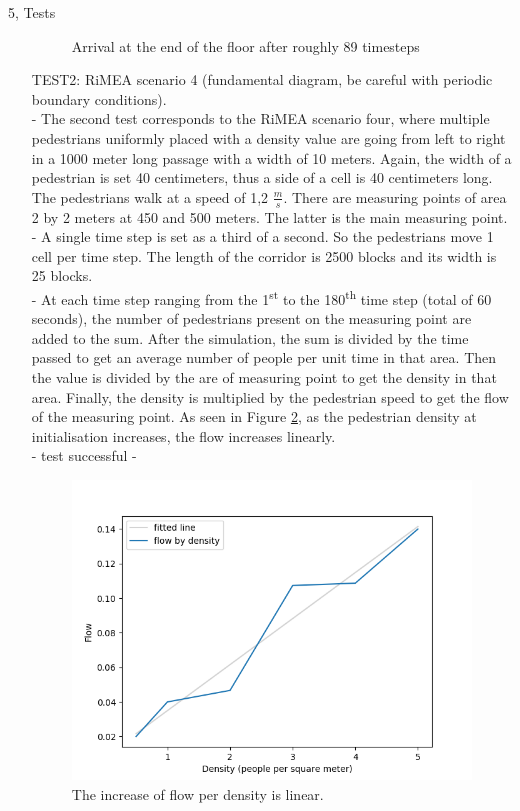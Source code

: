 \documentclass[10pt,a4paper]{article}
\begin{document}
\begin{task}{5, Tests}
\begin{enumerate}
\begin{figure}
    \caption{Arrival at the end of the floor after roughly 89 timesteps}
    \label{fig:result_test1}
\end{figure}
\item[TEST2:] RiMEA scenario 4 (fundamental diagram, be careful with periodic boundary conditions).\\
- The second test corresponds to the RiMEA scenario four, where multiple pedestrians uniformly placed with a density value are going from left to right in a 1000 meter long passage with a width of 10 meters. Again, the width of a pedestrian is set 40 centimeters, thus a side of a cell is 40 centimeters long. The pedestrians walk at a speed of 1,2 $\frac{m}{s}$. There are measuring points of area 2 by 2 meters at 450 and 500 meters. The latter is the main measuring point. \\
- A single time step is set as a third of a second. So the pedestrians move 1 cell per time step. The length of the corridor is 2500 blocks and its width is 25 blocks. \\
- At each time step ranging from the 1\textsuperscript{st} to the 180\textsuperscript{th} time step (total of 60 seconds), the number of pedestrians present on the measuring point are added to the sum. After the simulation, the sum is divided by the time passed to get an average number of people per unit time in that area. Then the value is divided by the are of measuring point to get the density in that area. Finally, the density is multiplied by the pedestrian speed to get the flow of the measuring point. As seen in Figure \ref{fig:test2_result}, as the pedestrian density at initialisation increases, the flow increases linearly. \\
- test successful - \\
\begin{figure}
    \centering
    \includegraphics[width=\textwidth]{pictures/test2result.png}
    \caption{The increase of flow per density is linear.}
    \label{fig:test2_result}
\end{figure}


\end{enumerate}
\end{task}
\end{document}
